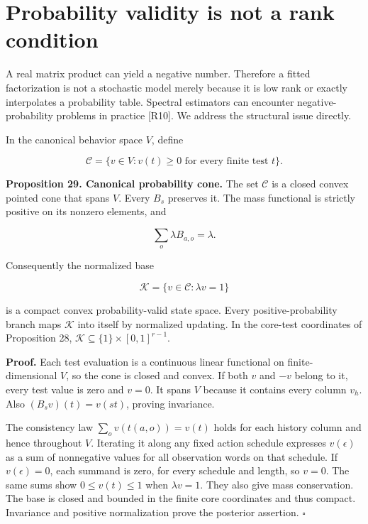 \section{Probability validity is not a rank condition}\label{LSM:probability-validity-is-not-a-rank-condition}

A real matrix product can yield a negative number. Therefore a fitted
factorization is not a stochastic model merely because it is low rank or
exactly interpolates a probability table. Spectral estimators can
encounter negative-probability problems in practice {[}R10{]}. We
address the structural issue directly.

In the canonical behavior space \(V\), define

\[
\mathcal C=\{v\in V:v(t)\geq0\text{ for every finite test }t\}.
\]

\textbf{Proposition 29. Canonical probability cone.} The set
\(\mathcal C\) is a closed convex pointed cone that spans \(V\). Every
\(B_s\) preserves it. The mass functional is strictly positive on its
nonzero elements, and

\[
\sum_o\lambda B_{a,o}=\lambda.
\]

Consequently the normalized base

\[
\mathcal K=\{v\in\mathcal C:\lambda v=1\}
\]

is a compact convex probability-valid state space. Every
positive-probability branch maps \(\mathcal K\) into itself by
normalized updating. In the core-test coordinates of Proposition 28,
\(\mathcal K\subseteq\{1\}\times[0,1]^{r-1}\).

\textbf{Proof.} Each test evaluation is a continuous linear functional
on finite-dimensional \(V\), so the cone is closed and convex. If both
\(v\) and \(-v\) belong to it, every test value is zero and \(v=0\). It
spans \(V\) because it contains every column \(v_h\). Also
\((B_sv)(t)=v(st)\), proving invariance.

The consistency law \(\sum_ov(t(a,o))=v(t)\) holds for each history
column and hence throughout \(V\). Iterating it along any fixed action
schedule expresses \(v(\epsilon)\) as a sum of nonnegative values for
all observation words on that schedule. If \(v(\epsilon)=0\), each
summand is zero, for every schedule and length, so \(v=0\). The same
sums show \(0\leq v(t)\leq1\) when \(\lambda v=1\). They also give mass
conservation. The base is closed and bounded in the finite core
coordinates and thus compact. Invariance and positive normalization
prove the posterior assertion. \(\square\)


